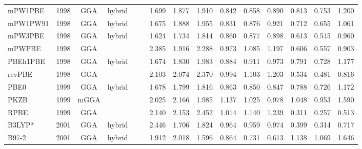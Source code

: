 \begin{landscape}
\begin{longtable}{ll:cccc:rrr:rrr:rrr}
    mPW1PBE          & 1998 & GGA  & hybrid   &             &           & 1.699             & 1.877             & 1.910  & 0.842              & 0.858             & 0.890  & 0.813   & 0.753 & 1.200 \\
    mPW1PW91         & 1998 & GGA  & hybrid   &             &           & 1.675             & 1.888             & 1.955  & 0.831              & 0.876             & 0.921  & 0.712   & 0.655 & 1.061 \\
    mPW3PBE          & 1998 & GGA  & hybrid   &             &           & 1.624             & 1.734             & 1.814  & 0.860              & 0.877             & 0.898  & 0.613   & 0.545 & 0.960 \\
    mPWPBE           & 1998 & GGA  &          &             &           & 2.385             & 1.916             & 2.288  & 0.973              & 1.085             & 1.197  & 0.606   & 0.557 & 0.903 \\
    PBEh1PBE         & 1998 & GGA  & hybrid   &             &           & 1.674             & 1.830             & 1.983  & 0.884              & 0.911             & 0.973  & 0.791   & 0.728 & 1.177 \\
    revPBE           & 1998 & GGA  &          &             &           & 2.103             & 2.074             & 2.370  & 0.994              & 1.103             & 1.203  & 0.534   & 0.481 & 0.816 \\
    PBE0             & 1999 & GGA  & hybrid   &             &           & 1.678             & 1.799             & 1.816  & 0.863              & 0.850             & 0.847  & 0.788   & 0.726 & 1.172 \\
    PKZB             & 1999 & mGGA &          &             &           & 2.025             & 2.166             & 1.985  & 1.137              & 1.025             & 0.978  & 1.048   & 0.953 & 1.590 \\
    RPBE             & 1999 & GGA  &          &             &           & 2.140             & 2.153             & 2.452  & 1.014              & 1.140             & 1.239  & 0.311   & 0.257 & 0.513 \\
    B3LYP*           & 2001 & GGA  & hybrid   &             &           & 2.446             & 1.706             & 1.824  & 0.964              & 0.959             & 0.974  & 0.399   & 0.314 & 0.717 \\
    B97-2            & 2001 & GGA  & hybrid   &             &           & 1.912             & 2.018             & 1.596  & 0.864              & 0.731             & 0.613  & 1.138   & 1.069 & 1.646 \\

\end{longtable}
\end{landscape}
